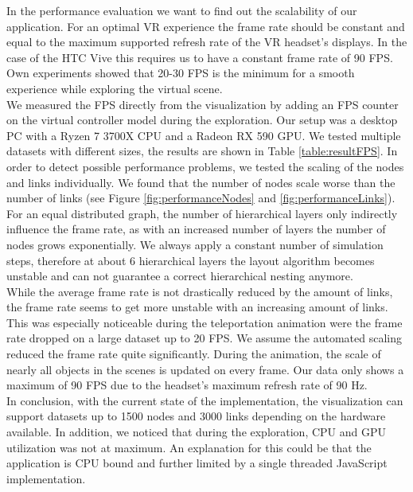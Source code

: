 In the performance evaluation we want to find out the scalability of our application. 
For an optimal VR experience the frame rate should be constant and equal to the maximum supported refresh rate of the VR headset's displays. In the case of the HTC Vive this requires us to have a constant frame rate of 90 FPS.
Own experiments showed that 20-30 FPS is the minimum for a smooth experience while exploring the virtual scene.
\\
We measured the FPS directly from the visualization by adding an FPS counter on the virtual controller model during the exploration. Our setup was a desktop PC with a Ryzen 7 3700X CPU and a Radeon RX 590 GPU. 
We tested multiple datasets with different sizes, the results are shown in Table \ref{table:resultFPS}. 
In order to detect possible performance problems, we tested the scaling of the nodes and links individually.
We found that the number of nodes scale worse than the number of links (see Figure \ref{fig:performanceNodes} and \ref{fig:performanceLinks}). 
For an equal distributed graph, the number of hierarchical layers only indirectly influence the frame rate, as with an increased number of layers the number of nodes grows exponentially.
We always apply a constant number of simulation steps, therefore at about 6 hierarchical layers the layout algorithm becomes unstable and can not guarantee a correct hierarchical nesting anymore.
\\
While the average frame rate is not drastically reduced by the amount of links, the frame rate seems to get more unstable with an increasing amount of links. 
This was especially noticeable during the teleportation animation were the frame rate dropped on a large dataset up to 20 FPS. 
We assume the automated scaling reduced the frame rate quite significantly. During the animation, the scale of nearly all objects in the scenes is updated on every frame.
Our data only shows a maximum of 90 FPS due to the headset's maximum refresh rate of 90 Hz.
\\
In conclusion, with the current state of the implementation, the visualization can support datasets up to 1500 nodes and 3000 links depending on the hardware available.
In addition, we noticed that during the exploration, CPU and GPU utilization was not at maximum. An explanation for this could be that the application is CPU bound and further limited by a single threaded JavaScript implementation.

